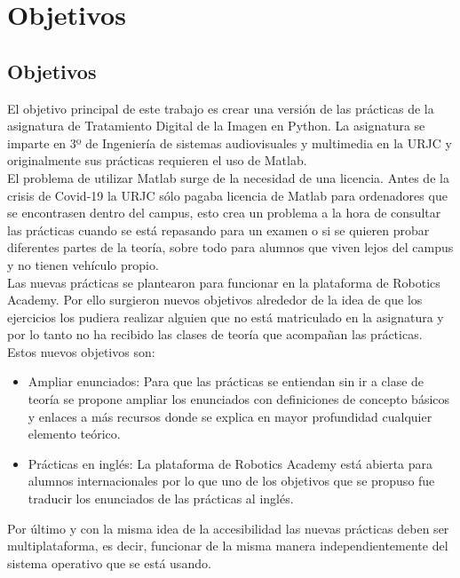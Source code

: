 \chapter{Objetivos}

\section{Objetivos}

El objetivo principal de este trabajo es crear una versión de las prácticas de la asignatura de Tratamiento Digital de la Imagen en Python. La asignatura se imparte en 3º de Ingeniería de sistemas audiovisuales y multimedia en la URJC y originalmente sus prácticas requieren el uso de Matlab. \\

El problema de utilizar Matlab surge de la necesidad de una licencia. Antes de la crisis de Covid-19 la URJC sólo pagaba licencia de Matlab para ordenadores que se encontrasen dentro del campus, esto crea un problema a la hora de consultar las prácticas cuando se está repasando para un examen o si se quieren probar diferentes partes de la teoría, sobre todo para alumnos que viven lejos del campus y no tienen vehículo propio.\\

Las nuevas prácticas se plantearon para funcionar en la plataforma de Robotics Academy. Por ello surgieron nuevos objetivos alrededor de la idea de que los ejercicios los pudiera realizar alguien que no está matriculado en la asignatura y por lo tanto no ha recibido las clases de teoría que acompañan las prácticas. Estos nuevos objetivos son:
\begin{itemize}
    \item Ampliar enunciados: Para que las prácticas se entiendan sin ir a clase de teoría se propone ampliar los enunciados con definiciones de concepto básicos y enlaces a más recursos donde se explica en mayor profundidad cualquier elemento teórico.
    \item Prácticas en inglés: La plataforma de Robotics Academy está abierta para alumnos internacionales por lo que uno de los objetivos que se propuso fue traducir los enunciados de las prácticas al inglés.
\end{itemize}

Por último y con la misma idea de la accesibilidad las nuevas prácticas deben ser multiplataforma, es decir, funcionar de la misma manera independientemente del sistema operativo que se está usando.

